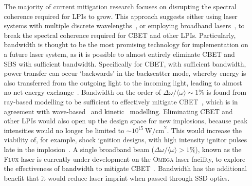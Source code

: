 The majority of current mitigation research focuses on disrupting the spectral coherence required for \ac{LPIs} to grow.
This approach suggests either using laser systems with multiple discrete wavelengths~\cite{edgell_mitigation_2017,marozas_first_2018,marozas_wavelengthdetuning_2018}, or employing broadband lasers~\cite{bates_mitigation_2018,bates_suppressing_2023}, to break the spectral coherence required for \ac{CBET} and other \ac{LPIs}.
Particularly, bandwidth is thought to be the most promising technology for implementation on a future laser system, as it is possible to almost entirely eliminate \ac{CBET} and \ac{SBS} with sufficient bandwidth.
Specifically for \ac{CBET}, with sufficient bandwidth, power transfer can occur `backwards' in the backscatter mode, whereby energy is also transferred from the outgoing light to the incoming light, leading to almost no net energy exchange~\cite{seaton_crossbeam_2022}.
Bandwidth on the order of $\Delta\omega/\langle\omega\rangle\sim1\%$ is found from ray-based modelling to be sufficient to effectively mitigate \ac{CBET}~\cite{colaitis_exploration_2023,follett_raybased_2023}, which is in agreement with wave-based~\cite{bates_suppressing_2023} and kinetic~\cite{seaton_crossbeam_2022} modelling.
Eliminating \ac{CBET} and other \ac{LPIs} would also open up the design space for new implosions, because peak intensities would no longer be limited to $\sim10^{15}\ \text{W/cm}^2$.
This would increase the viability of, for example, shock ignition designs, with high intensity ignitor pulses late in the implosion~\cite{betti_shock_2007,perkins_shock_2009,scott_shockaugmented_2022}.
A single broadband beam ($\Delta\omega/\langle\omega\rangle>1\%$), known as the \textsc{Flux} laser is currently under development on the \textsc{Omega} laser facility, to explore the effectiveness of bandwidth to mitigate \ac{CBET}~\cite{deeney_advances_2022}.
Bandwidth has the additional benefit that it would reduce laser imprint when passed through \ac{SSD} optics.
